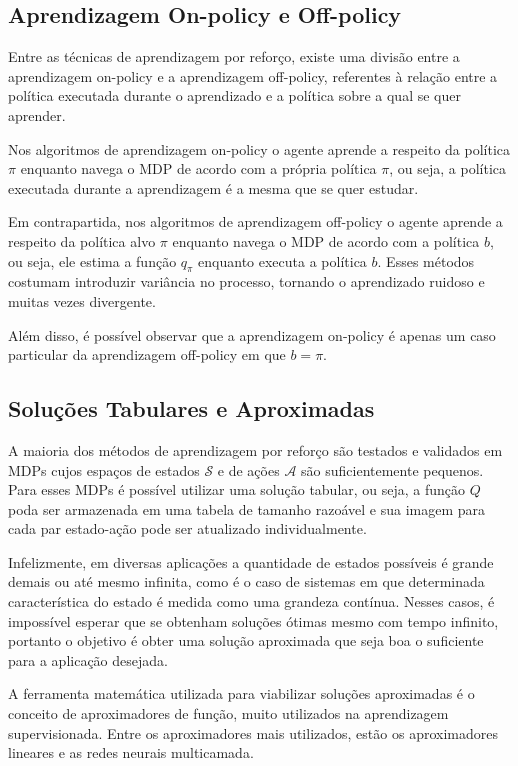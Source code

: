 \subsection{Aprendizagem On-policy e Off-policy}
\label{subsec:on-off-policy}
Entre as técnicas de aprendizagem por reforço, existe uma divisão entre a aprendizagem on-policy e a aprendizagem off-policy, referentes à relação entre a política executada durante o aprendizado e a política sobre a qual se quer aprender.

Nos algoritmos de aprendizagem on-policy o agente aprende a respeito da política $\pi$ enquanto navega o MDP de acordo com a própria política $\pi$, ou seja, a política executada durante a aprendizagem é a mesma que se quer estudar.

Em contrapartida, nos algoritmos de aprendizagem off-policy o agente aprende a respeito da política alvo $\pi$ enquanto navega o MDP de acordo com a política $b$, ou seja, ele estima a função $q_{\pi}$ enquanto executa a política $b$. Esses métodos costumam introduzir variância no processo, tornando o aprendizado ruidoso e muitas vezes divergente.

Além disso, é possível observar que a aprendizagem on-policy é apenas um caso particular da aprendizagem off-policy em que $b = \pi$.

\subsection{Soluções Tabulares e Aproximadas}

A maioria dos métodos de aprendizagem por reforço são testados e validados em MDPs cujos espaços de estados $\mathcal{S}$ e de ações $\mathcal{A}$ são suficientemente pequenos. Para esses MDPs é possível utilizar uma solução tabular, ou seja, a função $Q$ poda ser armazenada em uma tabela de tamanho razoável e sua imagem para cada par estado-ação pode ser atualizado individualmente.

Infelizmente, em diversas aplicações a quantidade de estados possíveis é grande demais ou até mesmo infinita, como é o caso de sistemas em que determinada característica do estado é medida como uma grandeza contínua. Nesses casos, é impossível esperar que se obtenham soluções ótimas mesmo com tempo infinito, portanto o objetivo é obter uma solução aproximada que seja boa o suficiente para a aplicação desejada.

A ferramenta matemática utilizada para viabilizar soluções aproximadas é o conceito de aproximadores de função, muito utilizados na aprendizagem supervisionada. Entre os aproximadores mais utilizados, estão os aproximadores lineares e as redes neurais multicamada.

